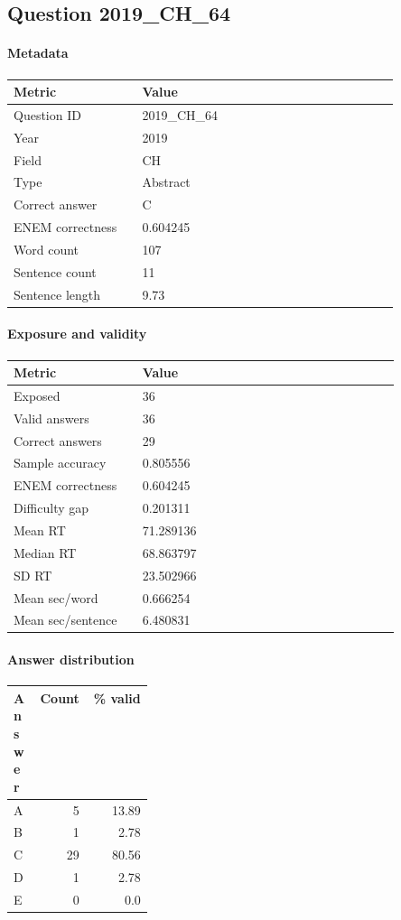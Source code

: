 \subsection*{Question 2019\_CH\_64}
\label{sec:q_2019_CH_64}
\paragraph{Metadata}
\begin{tabular}{p{0.30\linewidth}p{0.60\linewidth}}
\toprule
Metric & Value\\
\midrule
Question ID & 2019\_CH\_64\\
Year & 2019\\
Field & CH\\
Type & Abstract\\
Correct answer & C\\
ENEM correctness & 0.604245\\
Word count & 107\\
Sentence count & 11\\
Sentence length & 9.73\\
\bottomrule
\end{tabular}

\paragraph{Exposure and validity}
\begin{tabular}{p{0.30\linewidth}p{0.60\linewidth}}
\toprule
Metric & Value\\
\midrule
Exposed & 36\\
Valid answers & 36\\
Correct answers & 29\\
Sample accuracy & 0.805556\\
ENEM correctness & 0.604245\\
Difficulty gap & 0.201311\\
Mean RT & 71.289136\\
Median RT & 68.863797\\
SD RT & 23.502966\\
Mean sec/word & 0.666254\\
Mean sec/sentence & 6.480831\\
\bottomrule
\end{tabular}

\paragraph{Answer distribution}
\begin{tabular}{p{0.18\linewidth}rr}
\toprule
Answer & Count & \% valid\\
\midrule
A & 5 & 13.89\\
B & 1 & 2.78\\
C & 29 & 80.56\\
D & 1 & 2.78\\
E & 0 & 0.0\\
\bottomrule
\end{tabular}

